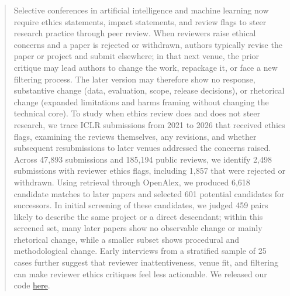 \documentclass[sigconf,nonacm]{acmart} %
\begin{document}
\begin{abstract}
Selective conferences in artificial intelligence and machine learning now require ethics statements, impact statements, and review flags to steer research practice through peer review. When reviewers raise ethical concerns and a paper is rejected or withdrawn, authors typically revise the paper or project and submit elsewhere; in that next venue, the prior critique may lead authors to change the work, repackage it, or face a new filtering process. The later version may therefore show no response, substantive change (data, evaluation, scope, release decisions), or rhetorical change (expanded limitations and harms framing without changing the technical core). To study when ethics review does and does not steer research, we trace ICLR submissions from 2021 to 2026 that received ethics flags, examining the reviews themselves, any revisions, and whether subsequent resubmissions to later venues addressed the concerns raised. Across 47,893 submissions and 185,194 public reviews, we identify 2,498 submissions with reviewer ethics flags, including 1,857 that were rejected or withdrawn. Using retrieval through OpenAlex, we produced 6,618 candidate matches to later papers and selected 601 potential candidates for successors. In initial screening of these candidates, we judged 459 pairs likely to describe the same project or a direct descendant; within this screened set, many later papers show no observable change or mainly rhetorical change, while a smaller subset shows procedural and methodological change. Early interviews from a stratified sample of 25 cases further suggest that reviewer inattentiveness, venue fit, and filtering can make reviewer ethics critiques feel less actionable. We released our code \href{https://github.com/KentoNishi/cs2760-ethics/}{here}. 
\end{abstract}

\end{document}
